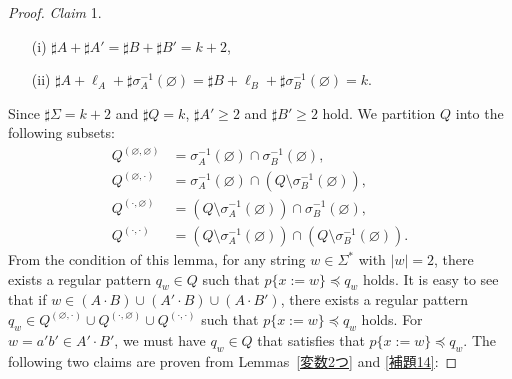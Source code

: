 \begin{proof}
\smallskip

\noindent
\textit{Claim} 1. 
\begin{enumerate}
  \item[(i)] $\sharp A + \sharp A' = \sharp B + \sharp B' = k + 2$,
  \item[(ii)] $\sharp A + \ell_{A} + \sharp \sigma_{A}^{-1}(\varnothing) = \sharp B + \ell_{B} + \sharp \sigma_{B}^{-1}(\varnothing) = k$.
\end{enumerate}

\smallskip

Since $\sharp \Sigma = k + 2$ and $\sharp Q = k$, $\sharp A' \geq 2$ and $\sharp B' \geq 2$ hold.
We partition $Q$ into the following subsets:
\begin{align*}
  Q^{(\varnothing,\varnothing)} & = \sigma_{A}^{-1}(\varnothing) \cap \sigma_{B}^{-1}(\varnothing),\\
  Q^{(\varnothing,\cdot)} & = \sigma_{A}^{-1}(\varnothing) \cap (Q\setminus \sigma_{B}^{-1}(\varnothing)),\\
  Q^{(\cdot,\varnothing)} & = (Q\setminus \sigma_{A}^{-1}(\varnothing)) \cap \sigma_{B}^{-1}(\varnothing),\\
  Q^{(\cdot,\cdot)} & = (Q\setminus \sigma_{A}^{-1}(\varnothing)) \cap (Q\setminus \sigma_{B}^{-1}(\varnothing)).
\end{align*}
From the condition of this lemma, for any string $w \in \Sigma^{\ast}$ with $|w|=2$, there exists a regular pattern $q_{w} \in Q$ such that $p \{ x:=w \} \preceq q_{w}$ holds.
It is easy to see that if $w \in (A\cdot B) \cup (A'\cdot B) \cup (A\cdot B')$, there exists a regular pattern $q_{w} \in Q^{(\varnothing,\cdot)} \cup Q^{(\cdot,\varnothing)} \cup Q^{(\cdot,\cdot)}$ such that $p \{ x:=w \} \preceq q_{w}$ holds.
For $w=a'b'\in A'\cdot B'$, we must have $q_{w} \in Q$ that satisfies that $p \{ x:=w \} \preceq q_{w}$. The following two claims are proven from Lemmas~\ref{変数2つ} and \ref{補題14}:


\end{proof}
